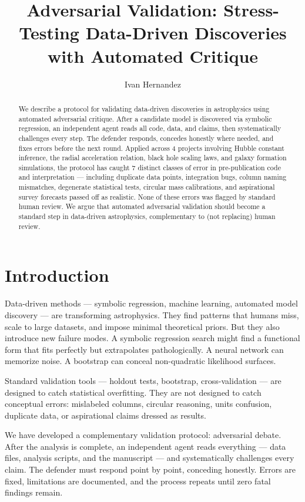 \documentclass[twocolumn]{aastex631}
\begin{document}
\title{Adversarial Validation: Stress-Testing Data-Driven Discoveries with
Automated Critique}

\author{Ivan Hernandez}

\begin{abstract}
We describe a protocol for validating data-driven discoveries in astrophysics
using automated adversarial critique.  After a candidate model is discovered
via symbolic regression, an independent agent reads all code, data, and
claims, then systematically challenges every step.  The defender responds,
concedes honestly where needed, and fixes errors before the next round.
Applied across 4 projects involving Hubble constant inference, the radial
acceleration relation, black hole scaling laws, and galaxy formation
simulations, the protocol has caught 7 distinct classes of error in
pre-publication code and interpretation --- including duplicate data points,
integration bugs, column naming mismatches, degenerate statistical tests,
circular mass calibrations, and aspirational survey forecasts passed off as
realistic.  None of these errors was flagged by standard human review.
We argue that automated adversarial validation should
become a standard step in data-driven astrophysics, complementary to (not
replacing) human review.
\end{abstract}

\section{Introduction}

Data-driven methods --- symbolic regression, machine learning, automated
model discovery --- are transforming astrophysics.  They find patterns that
humans miss, scale to large datasets, and impose minimal theoretical priors.
But they also introduce new failure modes.  A symbolic regression search
might find a functional form that fits perfectly but extrapolates pathologically.
A neural network can memorize noise.  A bootstrap can conceal non-quadratic
likelihood surfaces.

Standard validation tools --- holdout tests, bootstrap, cross-validation ---
are designed to catch statistical overfitting.  They are not designed to catch
conceptual errors: mislabeled columns, circular reasoning, units confusion,
duplicate data, or aspirational claims dressed as results.

We have developed a complementary validation protocol: adversarial debate.
After the analysis is complete, an independent agent reads everything ---
data files, analysis scripts, and the manuscript --- and systematically
challenges every claim.  The defender must respond point by point,
conceding honestly.  Errors are fixed, limitations are documented, and
the process repeats until zero fatal findings remain.
\end{document}
